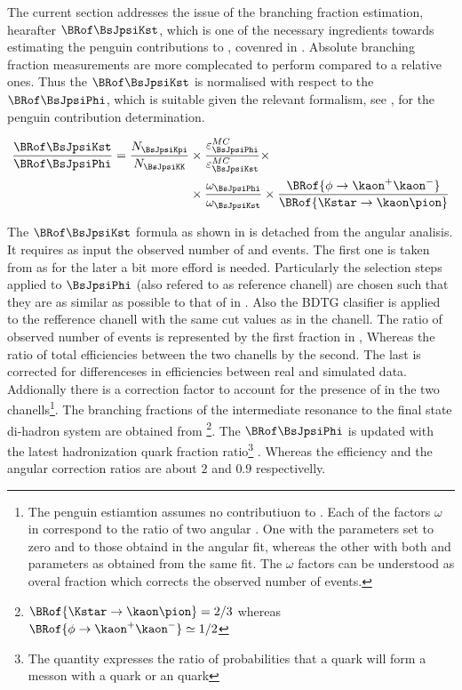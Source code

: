 
The current section addresses the issue of the \BsJpsiKst branching fraction estimation, hearafter $\BRof\BsJpsiKst$,
which is one of the necessary ingredients towards estimating the penguin contributions to \phis, covenred in .
Absolute branching fraction measurements are more complecated to perform compared to a relative ones. Thus the $\BRof\BsJpsiKst$ 
is normalised with respect to the $\BRof\BsJpsiPhi$, which is suitable given the relevant formalism, see ,
for the penguin contribution determination. 

\begin{align}
\frac{\BRof\BsJpsiKst}{\BRof\BsJpsiPhi} = \frac{N_{\BsJpsiKpi}}{N_{\BsJpsiKK}} &\times \frac{\varepsilon_{\BsJpsiPhi}^{MC}}{\varepsilon_{\BsJpsiKst}^{MC}} \times \nonumber \\
                                                                          &\times \frac{\omega_{\BsJpsiPhi}}{\omega_{\BsJpsiKst}} \times \frac{\BRof{\phi\to\kaon^+\kaon^-}}{\BRof{\Kstar\to\kaon\pion}} 
\label{norm_jpsiPhi}
\end{align}

\noindent The $\BRof\BsJpsiKst$ formula as shown in  is detached from the angular analisis. It requires as input the observed number 
of \BsJpsiKst and \BsJpsiPhi events. The first one is taken from  as for the later a bit more efford is needed.
Particularly the selection steps applied to $\BsJpsiPhi$ (also refered to as reference chanell) are chosen such that they are as 
similar as possible to that of \BsJpsiKst in . Also the BDTG clasifier is applied to the refference chanell
with the same cut values as in the \BsJpsiKst chanell. The ratio of observed number of events is represented by the first fraction in ,
Whereas the ratio of total efficiencies between the two chanells by the second. The last is corrected for differenceses in efficiencies between real and 
simulated data. Addionally there is a correction factor to account for the presence of \swave in the two 
chanells\footnote{The penguin estiamtion assumes no \swave contributiuon to \BsJpsiKst. Each of the factors $\omega$ in  correspond
to the ratio of two angular \pdfs. One with the \swave parameters set to zero and \pwave to those obtaind in the angular fit,  whereas the other
with both \pwave and \swave parameters as obtained from the same fit. The $\omega$ factors can be understood as overal \swave fraction which
corrects the observed number of events. 
}. The branching fractions of the intermediate resonance to the final state di-hadron system are obtained from \cite{PDG}
\footnote{ $\BRof{\Kstar\to\kaon\pion} = 2/3$ whereas $\BRof{\phi\to\kaon^+\kaon^-}\simeq 1/2$}.
The $\BRof\BsJpsiPhi$ \cite{SheldonKK} is updated with the latest hadronization \bquark quark fraction
ratio\footnote{The quantity \fdfs expresses the ratio of probabilities that a \bquark quark will form a messon with a \dquark quark or an \squark quark}
\cite{LHCb-CONF-2013-011}. Whereas the efficiency and the angular correction ratios are about $2$ and $0.9$ respectivelly. 

